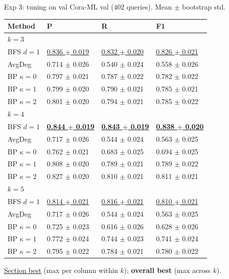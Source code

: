 \documentclass{beamer}
\begin{document}
\begin{frame}{Exp 3: tuning on val}
  Cora-ML val ($402$ queries). Mean $\pm$ bootstrap std.

  \tiny
  \begin{center}
  \begin{tabular}{llll}
    \toprule
    Method                       & P     & R     & F1 \\
    \midrule
    \multicolumn{4}{l}{\textit{$k = 3$}} \\
    BFS $d = 1$                  & \underline{0.836 $\pm$ 0.019} & \underline{0.832 $\pm$ 0.020} & \underline{0.826 $\pm$ 0.021} \\
    AvgDeg                       & 0.714 $\pm$ 0.026 & 0.540 $\pm$ 0.024 & 0.558 $\pm$ 0.026 \\
    BP $\kappa = 0$              & 0.797 $\pm$ 0.021 & 0.787 $\pm$ 0.022 & 0.782 $\pm$ 0.022 \\
    BP $\kappa = 1$              & 0.799 $\pm$ 0.020 & 0.790 $\pm$ 0.021 & 0.785 $\pm$ 0.021 \\
    BP $\kappa = 2$              & 0.801 $\pm$ 0.020 & 0.794 $\pm$ 0.021 & 0.785 $\pm$ 0.022 \\
    \midrule
    \multicolumn{4}{l}{\textit{$k = 4$}} \\
    BFS $d = 1$                  & \underline{\textbf{0.844 $\pm$ 0.019}} & \underline{\textbf{0.843 $\pm$ 0.019}} & \underline{\textbf{0.838 $\pm$ 0.020}} \\
    AvgDeg                       & 0.717 $\pm$ 0.026 & 0.544 $\pm$ 0.024 & 0.563 $\pm$ 0.025 \\
    BP $\kappa = 0$              & 0.762 $\pm$ 0.021 & 0.683 $\pm$ 0.025 & 0.694 $\pm$ 0.025 \\
    BP $\kappa = 1$              & 0.808 $\pm$ 0.020 & 0.789 $\pm$ 0.021 & 0.789 $\pm$ 0.022 \\
    BP $\kappa = 2$              & 0.827 $\pm$ 0.020 & 0.810 $\pm$ 0.021 & 0.811 $\pm$ 0.021 \\
    \midrule
    \multicolumn{4}{l}{\textit{$k = 5$}} \\
    BFS $d = 1$                  & \underline{0.814 $\pm$ 0.021} & \underline{0.816 $\pm$ 0.021} & \underline{0.810 $\pm$ 0.021} \\
    AvgDeg                       & 0.717 $\pm$ 0.026 & 0.544 $\pm$ 0.024 & 0.563 $\pm$ 0.025 \\
    BP $\kappa = 0$              & 0.725 $\pm$ 0.023 & 0.616 $\pm$ 0.026 & 0.628 $\pm$ 0.026 \\
    BP $\kappa = 1$              & 0.772 $\pm$ 0.024 & 0.744 $\pm$ 0.023 & 0.741 $\pm$ 0.024 \\
    BP $\kappa = 2$              & 0.795 $\pm$ 0.022 & 0.784 $\pm$ 0.021 & 0.780 $\pm$ 0.022 \\
    \bottomrule
  \end{tabular}
  \end{center}

  \scriptsize \underline{Section best} (max per column within $k$); \textbf{overall best} (max across $k$).
\end{frame}
\end{document}
